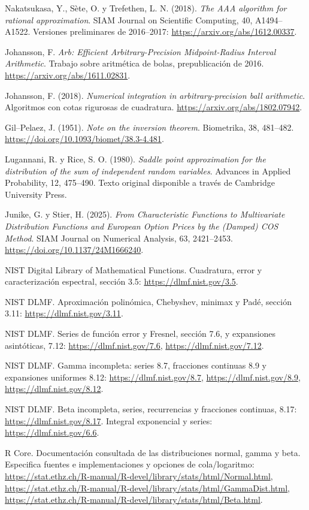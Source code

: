 \documentclass[11pt,a4paper]{article}
\theoremstyle{definition}
\begin{document}
\begin{enumerate}[label={[\arabic*]},itemsep=5pt]
\item Nakatsukasa, Y., Sète, O. y Trefethen, L. N. (2018). \textit{The AAA algorithm for rational approximation}. SIAM Journal on Scientific Computing, 40, A1494--A1522. Versiones preliminares de 2016--2017: \url{https://arxiv.org/abs/1612.00337}.
\item Johansson, F. \textit{Arb: Efficient Arbitrary-Precision Midpoint-Radius Interval Arithmetic}. Trabajo sobre aritmética de bolas, prepublicación de 2016. \url{https://arxiv.org/abs/1611.02831}.
\item Johansson, F. (2018). \textit{Numerical integration in arbitrary-precision ball arithmetic}. Algoritmos con cotas rigurosas de cuadratura. \url{https://arxiv.org/abs/1802.07942}.
\item Gil--Pelaez, J. (1951). \textit{Note on the inversion theorem}. Biometrika, 38, 481--482. \url{https://doi.org/10.1093/biomet/38.3-4.481}.
\item Lugannani, R. y Rice, S. O. (1980). \textit{Saddle point approximation for the distribution of the sum of independent random variables}. Advances in Applied Probability, 12, 475--490. Texto original disponible a través de Cambridge University Press.
\item Junike, G. y Stier, H. (2025). \textit{From Characteristic Functions to Multivariate Distribution Functions and European Option Prices by the (Damped) COS Method}. SIAM Journal on Numerical Analysis, 63, 2421--2453. \url{https://doi.org/10.1137/24M1666240}.
\item NIST Digital Library of Mathematical Functions. Cuadratura, error y caracterización espectral, sección 3.5: \url{https://dlmf.nist.gov/3.5}.
\item NIST DLMF. Aproximación polinómica, Chebyshev, minimax y Padé, sección 3.11: \url{https://dlmf.nist.gov/3.11}.
\item NIST DLMF. Series de función error y Fresnel, sección 7.6, y expansiones asintóticas, 7.12: \url{https://dlmf.nist.gov/7.6}, \url{https://dlmf.nist.gov/7.12}.
\item NIST DLMF. Gamma incompleta: series 8.7, fracciones continuas 8.9 y expansiones uniformes 8.12: \url{https://dlmf.nist.gov/8.7}, \url{https://dlmf.nist.gov/8.9}, \url{https://dlmf.nist.gov/8.12}.
\item NIST DLMF. Beta incompleta, series, recurrencias y fracciones continuas, 8.17: \url{https://dlmf.nist.gov/8.17}. Integral exponencial y series: \url{https://dlmf.nist.gov/6.6}.
\item R Core. Documentación consultada de las distribuciones normal, gamma y beta. Especifica fuentes e implementaciones y opciones de cola/logaritmo: \url{https://stat.ethz.ch/R-manual/R-devel/library/stats/html/Normal.html}, \url{https://stat.ethz.ch/R-manual/R-devel/library/stats/html/GammaDist.html}, \url{https://stat.ethz.ch/R-manual/R-devel/library/stats/html/Beta.html}.
\end{enumerate}
\endgroup
\end{document}
